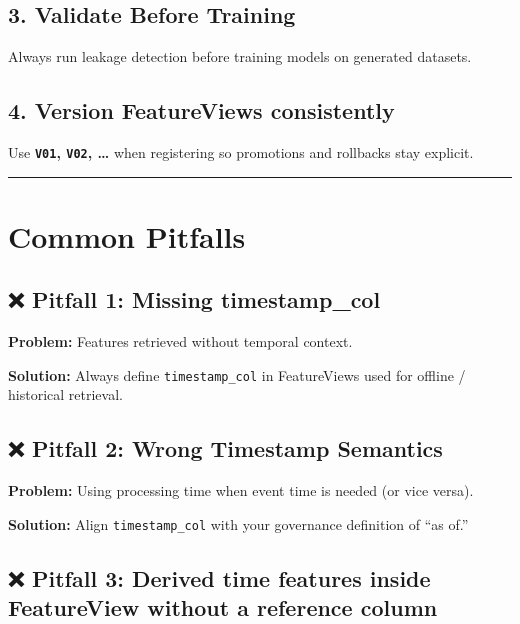 \documentclass[
  letterpaper,
  DIV=11,
  numbers=noendperiod]{scrreprt}
\begin{document}
\hypertarget{validate-before-training}{%
\subsection{3. Validate Before
Training}\label{validate-before-training}}

Always run leakage detection before training models on generated
datasets.

\hypertarget{version-featureviews-consistently}{%
\subsection{4. Version FeatureViews
consistently}\label{version-featureviews-consistently}}

Use \textbf{\texttt{V01}, \texttt{V02}, \ldots{}} when registering so
promotions and rollbacks stay explicit.

\begin{center}\rule{0.5\linewidth}{0.5pt}\end{center}

\hypertarget{common-pitfalls-4}{%
\section{Common Pitfalls}\label{common-pitfalls-4}}

\hypertarget{pitfall-1-missing-timestamp_col}{%
\subsection{❌ Pitfall 1: Missing
timestamp\_col}\label{pitfall-1-missing-timestamp_col}}

\textbf{Problem:} Features retrieved without temporal context.

\textbf{Solution:} Always define \texttt{timestamp\_col} in FeatureViews
used for offline / historical retrieval.

\hypertarget{pitfall-2-wrong-timestamp-semantics}{%
\subsection{❌ Pitfall 2: Wrong Timestamp
Semantics}\label{pitfall-2-wrong-timestamp-semantics}}

\textbf{Problem:} Using processing time when event time is needed (or
vice versa).

\textbf{Solution:} Align \texttt{timestamp\_col} with your governance
definition of ``as of.''

\hypertarget{pitfall-3-derived-time-features-inside-featureview-without-a-reference-column}{%
\subsection{❌ Pitfall 3: Derived time features inside FeatureView
without a reference
column}\label{pitfall-3-derived-time-features-inside-featureview-without-a-reference-column}}
\end{document}
